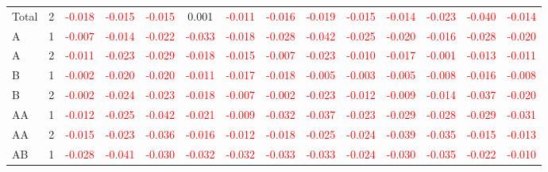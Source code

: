 \begin{table}[!htb]
{\begin{tabular}{llcccccccccccc}
Total & 2 & \textcolor{red}{-0.018} & \textcolor{red}{-0.015} & \textcolor{red}{-0.015} & 0.001 & \textcolor{red}{-0.011} & \textcolor{red}{-0.016} & \textcolor{red}{-0.019} & \textcolor{red}{-0.015} & \textcolor{red}{-0.014} & \textcolor{red}{-0.023} & \textcolor{red}{-0.040} & \textcolor{red}{-0.014}\\
A & 1 & \textcolor{red}{-0.007} & \textcolor{red}{-0.014} & \textcolor{red}{-0.022} & \textcolor{red}{-0.033} & \textcolor{red}{-0.018} & \textcolor{red}{-0.028} & \textcolor{red}{-0.042} & \textcolor{red}{-0.025} & \textcolor{red}{-0.020} & \textcolor{red}{-0.016} & \textcolor{red}{-0.028} & \textcolor{red}{-0.020}\\
A & 2 & \textcolor{red}{-0.011} & \textcolor{red}{-0.023} & \textcolor{red}{-0.029} & \textcolor{red}{-0.018} & \textcolor{red}{-0.015} & \textcolor{red}{-0.007} & \textcolor{red}{-0.023} & \textcolor{red}{-0.010} & \textcolor{red}{-0.017} & \textcolor{red}{-0.001} & \textcolor{red}{-0.013} & \textcolor{red}{-0.011}\\
B & 1 & \textcolor{red}{-0.002} & \textcolor{red}{-0.020} & \textcolor{red}{-0.020} & \textcolor{red}{-0.011} & \textcolor{red}{-0.017} & \textcolor{red}{-0.018} & \textcolor{red}{-0.005} & \textcolor{red}{-0.003} & \textcolor{red}{-0.005} & \textcolor{red}{-0.008} & \textcolor{red}{-0.016} & \textcolor{red}{-0.008}\\
B & 2 & \textcolor{red}{-0.002} & \textcolor{red}{-0.024} & \textcolor{red}{-0.023} & \textcolor{red}{-0.018} & \textcolor{red}{-0.007} & \textcolor{red}{-0.002} & \textcolor{red}{-0.023} & \textcolor{red}{-0.012} & \textcolor{red}{-0.009} & \textcolor{red}{-0.014} & \textcolor{red}{-0.037} & \textcolor{red}{-0.020}\\
AA & 1 & \textcolor{red}{-0.012} & \textcolor{red}{-0.025} & \textcolor{red}{-0.042} & \textcolor{red}{-0.021} & \textcolor{red}{-0.009} & \textcolor{red}{-0.032} & \textcolor{red}{-0.037} & \textcolor{red}{-0.023} & \textcolor{red}{-0.029} & \textcolor{red}{-0.028} & \textcolor{red}{-0.029} & \textcolor{red}{-0.031}\\
AA & 2 & \textcolor{red}{-0.015} & \textcolor{red}{-0.023} & \textcolor{red}{-0.036} & \textcolor{red}{-0.016} & \textcolor{red}{-0.012} & \textcolor{red}{-0.018} & \textcolor{red}{-0.025} & \textcolor{red}{-0.024} & \textcolor{red}{-0.039} & \textcolor{red}{-0.035} & \textcolor{red}{-0.015} & \textcolor{red}{-0.013}\\
AB & 1 & \textcolor{red}{-0.028} & \textcolor{red}{-0.041} & \textcolor{red}{-0.030} & \textcolor{red}{-0.032} & \textcolor{red}{-0.032} & \textcolor{red}{-0.033} & \textcolor{red}{-0.033} & \textcolor{red}{-0.024} & \textcolor{red}{-0.030} & \textcolor{red}{-0.035} & \textcolor{red}{-0.022} & \textcolor{red}{-0.010}\\

\end{tabular}}
\end{table}
